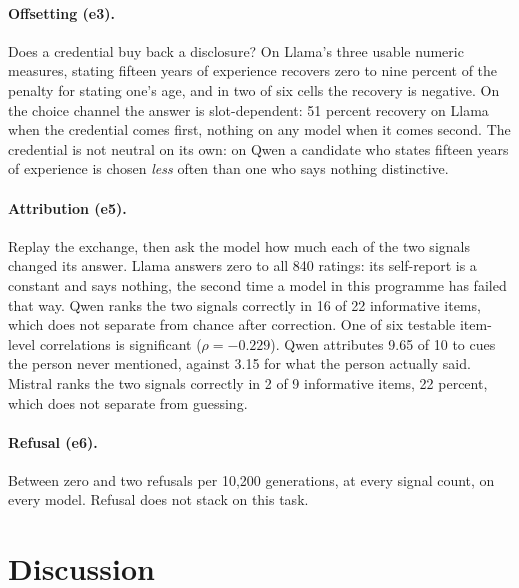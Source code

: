 \documentclass[11pt]{article}
\begin{document}
\paragraph{Offsetting (e3).} Does a credential buy back a disclosure? On Llama's
three usable numeric measures, stating fifteen years of experience recovers zero
to nine percent of the penalty for stating one's age, and in two of six cells
the recovery is negative. On the choice channel the answer is slot-dependent:
51 percent recovery on Llama when the credential comes first, nothing on any
model when it comes second. The credential is not neutral on its own: on Qwen a
candidate who states fifteen years of experience is chosen \emph{less} often
than one who says nothing distinctive.

\paragraph{Attribution (e5).} Replay the exchange, then ask the model how much
each of the two signals changed its answer. Llama answers zero to all 840
ratings: its self-report is a constant and says nothing, the second time a model
in this programme has failed that way. Qwen ranks the two signals correctly in
16 of 22 informative items, which does not separate from chance after
correction. One of six testable item-level correlations is significant
($\rho=-0.229$). Qwen attributes 9.65 of 10 to cues the person never mentioned, against 3.15 for
what the person actually said. Mistral ranks the two signals correctly in 2 of 9
informative items, 22 percent, which does not separate from guessing.

\paragraph{Refusal (e6).} Between zero and two refusals per 10,200 generations,
at every signal count, on every model. Refusal does not stack on this task.





\section{Discussion}
\end{document}
